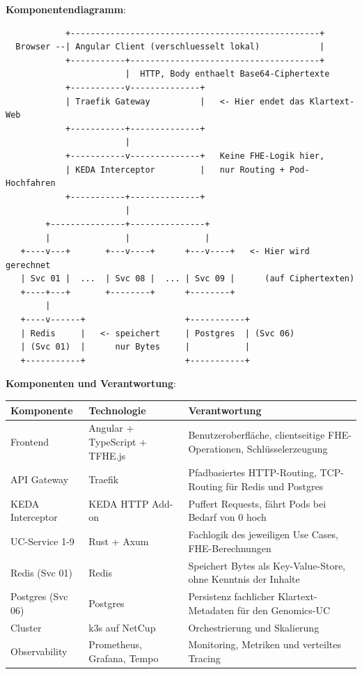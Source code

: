 \textbf{Komponentendiagramm}:

\begin{verbatim}
            +--------------------------------------------------+
  Browser --| Angular Client (verschluesselt lokal)            |
            +-----------+--------------------------------------+
                        |  HTTP, Body enthaelt Base64-Ciphertexte
            +-----------v--------------+
            | Traefik Gateway          |   <- Hier endet das Klartext-Web
            +-----------+--------------+
                        |
            +-----------v--------------+   Keine FHE-Logik hier,
            | KEDA Interceptor         |   nur Routing + Pod-Hochfahren
            +-----------+--------------+
                        |
        +---------------+---------------+
        |               |               |
   +----v---+       +---v----+      +---v----+   <- Hier wird gerechnet
   | Svc 01 |  ...  | Svc 08 |  ... | Svc 09 |      (auf Ciphertexten)
   +----+---+       +--------+      +--------+
        |
   +----v------+                    +-----------+
   | Redis     |   <- speichert     | Postgres  | (Svc 06)
   | (Svc 01)  |      nur Bytes     |           |
   +-----------+                    +-----------+
\end{verbatim}

\textbf{Komponenten und Verantwortung}:

\begin{tabular}{||l|p{3.5cm}|p{6cm}||}
    \hline
    \textbf{Komponente} & \textbf{Technologie} & \textbf{Verantwortung} \\
    \hline\hline
    Frontend & Angular + TypeScript + TFHE.js & Benutzeroberfläche, clientseitige FHE-Operationen, Schlüsselerzeugung \\
    \hline
    API Gateway & Traefik & Pfadbasiertes HTTP-Routing, TCP-Routing für Redis und Postgres \\
    \hline
    KEDA Interceptor & KEDA HTTP Add-on & Puffert Requests, fährt Pods bei Bedarf von 0 hoch \\
    \hline
    UC-Service 1-9 & Rust + Axum & Fachlogik des jeweiligen Use Cases, FHE-Berechnungen \\
    \hline
    Redis (Svc 01) & Redis & Speichert Bytes als Key-Value-Store, ohne Kenntnis der Inhalte \\
    \hline
    Postgres (Svc 06) & Postgres & Persistenz fachlicher Klartext-Metadaten für den Genomics-UC \\
    \hline
    Cluster & k3s auf NetCup & Orchestrierung und Skalierung \\
    \hline
    Observability & Prometheus, Grafana, Tempo & Monitoring, Metriken und verteiltes Tracing \\
    \hline
\end{tabular}

